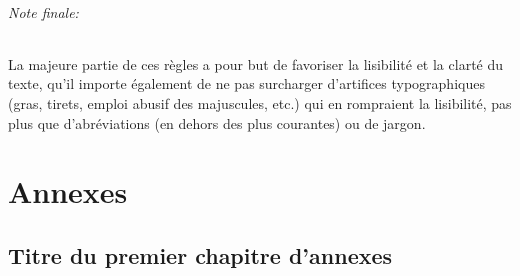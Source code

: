 \documentclass[a4paper,12pt]{book}
\begin{document}
\paragraph{Note finale:} La majeure partie de ces règles a pour but de favoriser la lisibilité et la clarté du texte, qu'il importe également de ne pas surcharger d'artifices typographiques (gras, tirets, emploi abusif des majuscules, etc.) qui en rompraient la lisibilité, pas plus que d'abréviations (en dehors des plus courantes) ou de jargon.

\appendix
\part*{Annexes}
\chapter{Titre du premier chapitre d'annexes}

\backmatter

\listoffigures
\tableofcontents
\end{document}
